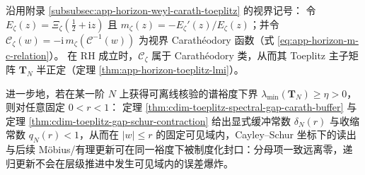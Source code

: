 \begin{corollary}\label{cor:cdim-toeplitz-gap-stability-rh}
沿用附录 \ref{subsubsec:app-horizon-weyl-carath-toeplitz} 的视界记号：
令
\(
E_\zeta(z)=\Xi_\zeta(\tfrac12+\mathrm{i}z)
\)
且 \(m_\zeta(z)=-E_\zeta'(z)/E_\zeta(z)\)；并令 \(\mathscr{C}_\zeta(w)=-\mathrm{i}\,m_\zeta(\mathcal{C}^{-1}(w))\) 为视界 Carath\'eodory 函数（式 \eqref{eq:app-horizon-m-c-relation}）。
在 RH 成立时，\(\mathscr{C}_\zeta\) 属于 Carath\'eodory 类，从而其 Toeplitz 主子矩阵 \(\mathbf{T}_N\) 半正定（定理 \ref{thm:app-horizon-toeplitz-lmi}）。
\par
进一步地，若在某一阶 \(N\) 上获得可离线核验的谱裕度下界 \(\lambda_{\min}(\mathbf{T}_N)\ge \eta>0\)，则对任意固定 \(0<r<1\)：
定理 \ref{thm:cdim-toeplitz-spectral-gap-carath-buffer} 与定理 \ref{thm:cdim-toeplitz-gap-schur-contraction} 给出显式缓冲常数 \(\delta_N(r)\) 与收缩常数 \(q_N(r)<1\)，从而在 \(|w|\le r\) 的固定可见域内，Cayley--Schur 坐标下的读出与后续 Möbius/有理更新可在同一裕度下被制度化封口：分母项一致远离零，递归更新不会在层级推进中发生可见域内的误差爆炸。
\end{corollary}

\endinput
